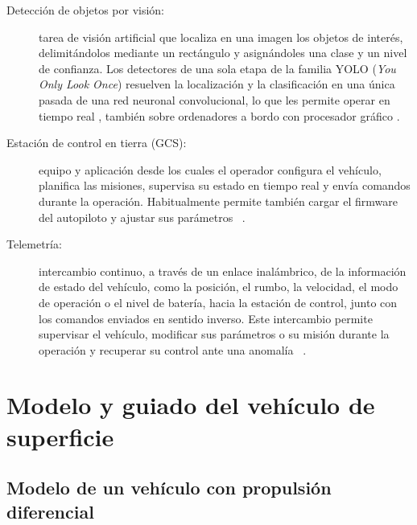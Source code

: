 \begin{description}
  \item[Detección de objetos por visión:] tarea de visión artificial que localiza en una imagen los 
  objetos de interés, delimitándolos mediante un rectángulo y asignándoles una clase y un nivel de 
  confianza. Los detectores de una sola etapa de la familia YOLO (\textit{You Only Look Once}) resuelven 
  la localización y la clasificación en una única pasada de una red neuronal convolucional, lo que les 
  permite operar en tiempo real \cite{redmon2016}, también sobre ordenadores a bordo con procesador 
  gráfico \cite{kumar2025}.
 
  \item[Estación de control en tierra (GCS):] equipo y aplicación desde los cuales el
    operador configura el vehículo, planifica las misiones, supervisa su estado en
    tiempo real y envía comandos durante la operación. Habitualmente permite también
    cargar el firmware del autopiloto y ajustar sus parámetros~\cite{iniesta2025} \cite{aliane2026}.
 
  \item[Telemetría:] intercambio continuo, a través de un enlace inalámbrico, de la
    información de estado del vehículo, como la posición, el rumbo, la velocidad, el
    modo de operación o el nivel de batería, hacia la estación de control, junto con los
    comandos enviados en sentido inverso. Este intercambio permite supervisar el
    vehículo, modificar sus parámetros o su misión durante la operación y recuperar su
    control ante una anomalía~\cite{iniesta2025} \cite{aliane2026}.
 
\end{description}
 

 
\section{Modelo y guiado del vehículo de superficie}
\label{sec:modelo_usv}
 
\subsection{Modelo de un vehículo con propulsión diferencial}
\label{subsec:modelo_propulsion}
 

